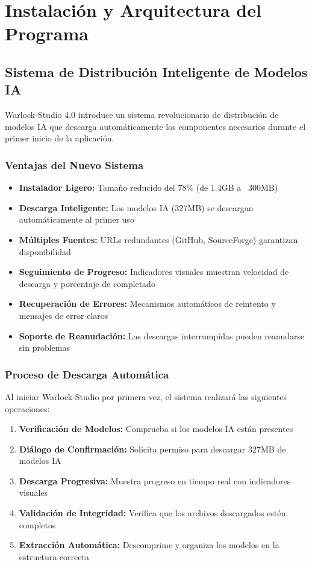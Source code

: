 \documentclass[11pt, a4paper]{article}
\begin{document}
\section{Instalación y Arquitectura del Programa}

\subsection{Sistema de Distribución Inteligente de Modelos IA}
\begin{infobox}
Warlock-Studio 4.0 introduce un sistema revolucionario de distribución de modelos IA que descarga automáticamente los componentes necesarios durante el primer inicio de la aplicación.
\end{infobox}

\subsubsection{Ventajas del Nuevo Sistema}
\begin{itemize}[leftmargin=*]
    \item \textbf{Instalador Ligero:} Tamaño reducido del 78\% (de 1.4GB a ~300MB)
    \item \textbf{Descarga Inteligente:} Los modelos IA (327MB) se descargan automáticamente al primer uso
    \item \textbf{Múltiples Fuentes:} URLs redundantes (GitHub, SourceForge) garantizan disponibilidad
    \item \textbf{Seguimiento de Progreso:} Indicadores visuales muestran velocidad de descarga y porcentaje de completado
    \item \textbf{Recuperación de Errores:} Mecanismos automáticos de reintento y mensajes de error claros
    \item \textbf{Soporte de Reanudación:} Las descargas interrumpidas pueden reanudarse sin problemas
\end{itemize}

\subsubsection{Proceso de Descarga Automática}
Al iniciar Warlock-Studio por primera vez, el sistema realizará las siguientes operaciones:
\begin{enumerate}[leftmargin=*]
    \item \textbf{Verificación de Modelos:} Comprueba si los modelos IA están presentes
    \item \textbf{Diálogo de Confirmación:} Solicita permiso para descargar 327MB de modelos IA
    \item \textbf{Descarga Progresiva:} Muestra progreso en tiempo real con indicadores visuales
    \item \textbf{Validación de Integridad:} Verifica que los archivos descargados estén completos
    \item \textbf{Extracción Automática:} Descomprime y organiza los modelos en la estructura correcta
\end{enumerate}
\end{document}
